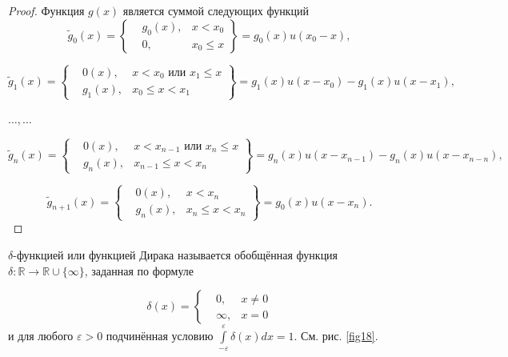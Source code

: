 \begin{proof}
	Функция $g(x)$ является суммой следующих функций
	\begin{equation*}
		\widetilde{g}_0(x)=
		\left\{\begin{aligned}
			&g_0(x), &x<x_0\\
			&0,		&x_0\leqslant x
		\end{aligned}\right\}
		=g_0(x)u(x_0-x),
	\end{equation*}

	\begin{equation*}
		\widetilde{g}_1(x)=
		\left\{\begin{aligned}
			&0(x), &x<x_0 \text{ или } x_1\leqslant x \\
			&g_1(x), &x_0\leqslant x<x_1
		\end{aligned}\right\}
		=g_1(x)u(x-x_0)-g_1(x)u(x-x_1),
	\end{equation*}

\begin{center}
	$\ldots,\ldots$
\end{center}

	\begin{equation*}
		\widetilde{g}_n(x)=
		\left\{\begin{aligned}
			&0(x), &x<x_{n-1} \text{ или } x_n\leqslant x \\
			&g_n(x), &x_{n-1}\leqslant x<x_n
		\end{aligned}\right\}
		=g_n(x)u(x-x_{n-1})-g_n(x)u(x-x_{n-n}),
	\end{equation*}

		\begin{equation*}
		\widetilde{g}_{n+1}(x)=
		\left\{\begin{aligned}
			&0(x), &x<x_{n}\\
			&g_n(x),&x_{n}\leqslant x<x_n
		\end{aligned}\right\}
		=g_0(x)u(x-x_{n}).
	\end{equation*}

\end{proof}

\begin{definition}
\label{def:13.4}
	$\delta$-функцией или функцией Дирака называется обобщённая функция
	$\delta : \mathbb{R}\rightarrow\mathbb{R}\cup\{\infty\}$, заданная по формуле

	\begin{equation*}
		\delta(x)=
		\left\{\begin{aligned}
			&0, &x \neq 0 \\
			&\infty, &x=0			
		\end{aligned}\right.
	\end{equation*}
	и для любого $\varepsilon > 0$ подчинённая условию $\int\limits^\varepsilon_{-\varepsilon}\delta(x)dx=1$. См. рис. \ref{fig18}.
\end{definition}


